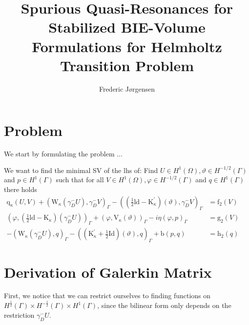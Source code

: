 \documentclass[10pt,journal,compsoc]{IEEEtran}
\begin{document}
\title{Spurious Quasi-Resonances for Stabilized BIE-Volume Formulations for Helmholtz Transition Problem}

\author{Frederic Jørgensen}








\maketitle

\IEEEdisplaynontitleabstractindextext
\IEEEpeerreviewmaketitle



\section{Problem }
We start by formulating the problem ...

We want to find the minimal SV of the lhs of: 
Find \(U \in H^{1}(\Omega), \vartheta \in H^{-1 / 2}(\Gamma)\) and \(p \in H^{1}(\Gamma)\) such that for all \(V \in H^{1}(\Omega), \varphi \in H^{-1 / 2}(\Gamma)\)
and \(q \in H^{1}(\Gamma)\) there holds
\(\begin{aligned} \mathrm{q}_{\kappa}(U, V)+\left(\mathrm{W}_{\kappa}\left(\gamma_{D}^{-} U\right), \gamma_{D}^{-} V\right)_{\Gamma}-\left(\left(\frac{1}{2} \mathrm{ld}-\mathrm{K}_{\kappa}^{\prime}\right)(\vartheta), \gamma_{D}^{-} V\right)_{\Gamma} &=\mathrm{f}_{2}(V) \\\left(\varphi,\left(\frac{1}{2} \mathrm{ld}-\mathrm{K}_{\kappa}\right)\left(\gamma_{D}^{-} U\right)\right)_{\Gamma}+\left(\varphi, \mathrm{V}_{\kappa}(\vartheta)\right)_{\Gamma}-i \eta(\varphi, p)_{\Gamma} &=\mathrm{g}_{2}(V) \\-\left(\mathrm{W}_{\kappa}\left(\gamma_{D}^{-} U\right), q\right)_{\Gamma}-\left(\left(\mathrm{K}_{\kappa}^{\prime}+\frac{1}{2} \mathrm{Id}\right)(\vartheta), q\right)_{\Gamma}+\mathrm{b}(p, q) &=\mathrm{h}_{2}(q) \end{aligned}\)

\section{Derivation of Galerkin Matrix}
First, we notice that we can restrict ourselves to finding functions on $H^{\frac{1}{2}}(\Gamma)\times H^{-\frac{1}{2}}(\Gamma) \times H^1(\Gamma)$, since the bilinear form only depends on the restriction $\gamma_D^-U$. 
\end{document}

